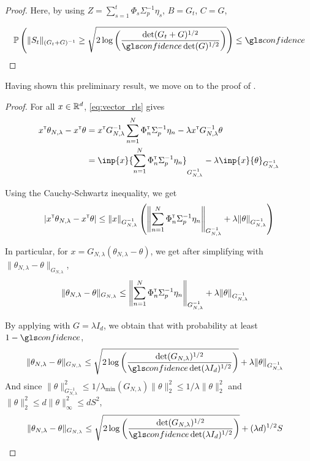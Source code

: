 \begin{subappendices}
\begin{proof}
		Here, by using $Z = \sum_{s=1}^t\Phi_s\Sigma_p^{-1}\eta_s$, $B=G_t$, $C=G$,
		
		\[
		\probability{\| S_t \|_{(G_t+G)^{-1}} \geq \sqrt{2\log \left(\frac{\det(G_t+G)^{1/2}}{\confidence\det(G)^{1/2}}\right)}} \leq \confidence
		\]
		
	\end{proof}
	
	Having shown this preliminary result, we move on to the proof of .
	
	\begin{proof}
		For all $x\in\mathbb{R}^d$, \eqref{eq:vector_rls} gives
		\begin{align*}
		x^\transp\theta_{N,\lambda}  -x^\transp\theta &= x^\transp G_{N, \lambda}^{-1}\sum_{n=1}^N \Phi_n^\transp \Sigma_p^{-1}\eta_n
		- \lambda x^\transp G_{N, \lambda}^{-1}\theta\\
		&= \inp{x}{\sum_{n=1}^N \Phi_n^\transp \Sigma_p^{-1}\eta_n}_{G_{N, \lambda}^{-1}} - \lambda\inp{x}{\theta}_{G_{N, \lambda}^{-1}}
		\end{align*}
		
		Using the Cauchy-Schwartz inequality, we get
		\begin{align*}
		|x^{\mathsf{\scriptscriptstyle T}}\theta_{N,\lambda}  -x^{\mathsf{\scriptscriptstyle T}}\theta| \leq \|x\|_{G_{N, \lambda}^{-1}}\left(\left\|\sum_{n=1}^N \Phi_n^{\mathsf{\scriptscriptstyle T}} \Sigma_p^{-1}\eta_n\right\|_{G_{N, \lambda}^{-1}} + \lambda\|\theta\|_{G_{N, \lambda}^{-1}}\right)
		\end{align*}
		
		In particular, for $x = G_{N,\lambda}(\theta_{N,\lambda} - \theta)$, we get after simplifying with $\| \theta_{N,\lambda}  - \theta\|_{G_{N,\lambda}}$,
		\begin{align*}
		\| \theta_{N,\lambda}  - \theta\|_{G_{N,\lambda}} &\leq \left\|\sum_{n=1}^N \Phi_n^{\mathsf{\scriptscriptstyle T}} \Sigma_p^{-1}\eta_n\right\|_{G_{N, \lambda}^{-1}} + \lambda\|\theta\|_{G_{N, \lambda}^{-1}}
		\end{align*}
		
		By applying  with $G=\lambda I_d$, we obtain that with probability at least $1-\confidence$,
		\begin{align*}
		\| \theta_{N,\lambda}  - \theta\|_{G_{N,\lambda}} &\leq \sqrt{2\log \left(\frac{\det(G_{N,\lambda})^{1/2}}{\confidence\det(\lambda I_d)^{1/2}}\right)}
		+ \lambda\|\theta\|_{G_{N, \lambda}^{-1}}
		\end{align*}
		And since $\|\theta\|_{G_{N, \lambda}^{-1}}^2 \leq 1/\lambda_{\min}(G_{N,\lambda})\|\theta\|_2^2 \leq 1/\lambda \|\theta\|_2^2$ and $\|\theta\|_2^2 \leq d\|\theta\|_\infty^2\leq d S^2$,
		\begin{align*}
		\| \theta_{N,\lambda}  - \theta\|_{G_{N,\lambda}} &\leq \sqrt{2\log \left(\frac{\det(G_{N,\lambda})^{1/2}}{\confidence\det(\lambda I_d)^{1/2}}\right)}
		+ (\lambda d)^{1/2}S
		\end{align*}
	\end{proof}
	

\end{subappendices}
